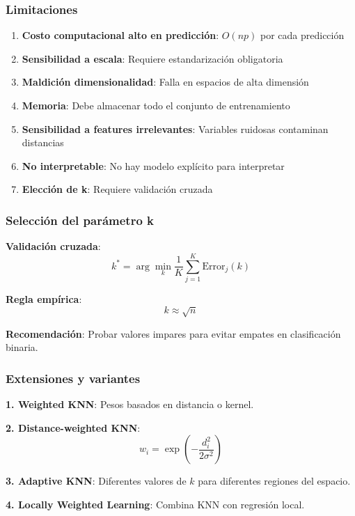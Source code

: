 \documentclass[
  doc,
  floatsintext,
  longtable,
  a4paper,
  nolmodern,
  notxfonts,
  notimes,
  12pt,
  colorlinks=true,linkcolor=blue,citecolor=blue,urlcolor=blue]{apa7}
\providecommand{\tightlist}{%
  \setlength{\itemsep}{0pt}\setlength{\parskip}{0pt}}
\begin{document}
\subsubsection{Limitaciones}\label{limitaciones-1}

\begin{enumerate}
\def\labelenumi{\arabic{enumi}.}
\tightlist
\item
  \textbf{Costo computacional alto en predicción}: \(O(np)\) por cada
  predicción
\item
  \textbf{Sensibilidad a escala}: Requiere estandarización obligatoria
\item
  \textbf{Maldición dimensionalidad}: Falla en espacios de alta
  dimensión
\item
  \textbf{Memoria}: Debe almacenar todo el conjunto de entrenamiento
\item
  \textbf{Sensibilidad a features irrelevantes}: Variables ruidosas
  contaminan distancias
\item
  \textbf{No interpretable}: No hay modelo explícito para interpretar
\item
  \textbf{Elección de k}: Requiere validación cruzada
\end{enumerate}

\subsubsection{Selección del parámetro
k}\label{selecciuxf3n-del-paruxe1metro-k}

\textbf{Validación cruzada}: \[
k^* = \arg\min_{k} \frac{1}{K} \sum_{j=1}^{K} \text{Error}_j(k)
\]

\textbf{Regla empírica}: \[
k \approx \sqrt{n}
\]

\textbf{Recomendación}: Probar valores impares para evitar empates en
clasificación binaria.

\subsubsection{Extensiones y variantes}\label{extensiones-y-variantes}

\textbf{1. Weighted KNN}: Pesos basados en distancia o kernel.

\textbf{2. Distance-weighted KNN}: \[
w_i = \exp\left(-\frac{d_i^2}{2\sigma^2}\right)
\]

\textbf{3. Adaptive KNN}: Diferentes valores de \(k\) para diferentes
regiones del espacio.

\textbf{4. Locally Weighted Learning}: Combina KNN con regresión local.
\end{document}
